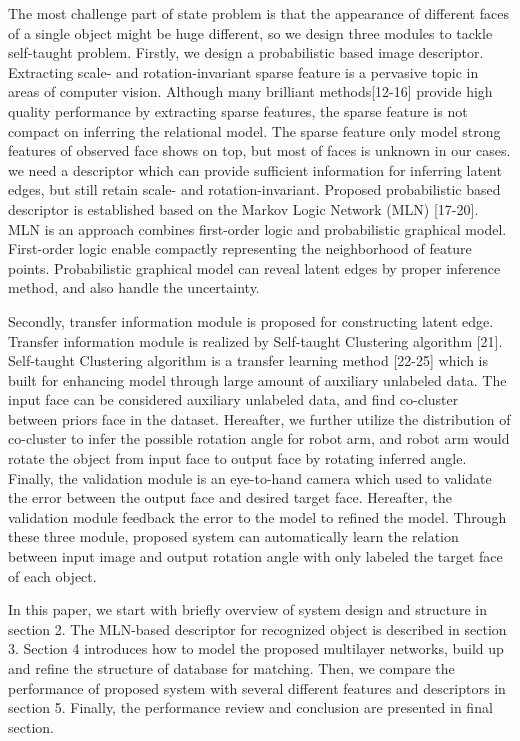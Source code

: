 \documentclass[journal]{IEEEtran}
\begin{document}
The most challenge part of state problem is that the appearance of different faces of a single object might be huge different, so we design three modules to tackle self-taught problem. Firstly, we design a probabilistic based image descriptor. Extracting scale- and rotation-invariant sparse feature is a pervasive topic in areas of computer vision. Although many brilliant methods[12-16] provide high quality performance by extracting sparse features, the sparse feature is not compact on inferring the relational model. The sparse feature only model strong features of observed face shows on top, but most of faces is unknown in our cases. we need a descriptor which can provide sufficient information for inferring latent edges, but still retain scale- and rotation-invariant. Proposed probabilistic based descriptor is established based on the Markov Logic Network (MLN) [17-20]. MLN is an approach combines first-order logic and probabilistic graphical model. First-order logic enable compactly representing the neighborhood of feature points. Probabilistic graphical model can reveal latent edges by proper inference method, and also handle the uncertainty. 

Secondly, transfer information module is proposed for constructing latent edge. Transfer information module is realized by Self-taught Clustering algorithm [21]. Self-taught Clustering algorithm is a transfer learning method [22-25] which is built for enhancing model through large amount of auxiliary unlabeled data. The input face can be considered auxiliary unlabeled data, and find co-cluster between priors face in the dataset. Hereafter, we further utilize the distribution of co-cluster to infer the possible rotation angle for robot arm, and robot arm would rotate the object from input face to output face by rotating inferred angle. Finally, the validation module is an eye-to-hand camera which used to validate the error between the output face and desired target face. Hereafter, the validation module feedback the error to the model to refined the model. Through these three module, proposed system can automatically learn the relation between input image and output rotation angle with only labeled the target face of each object.

In this paper, we start with briefly overview of system design and structure in section 2. The MLN-based descriptor for recognized object is described in section 3. Section 4 introduces how to model the proposed multilayer networks, build up and refine the structure of database for matching. Then, we compare the performance of proposed system with several different features and descriptors in section 5. Finally, the performance review and conclusion are presented in final section.
\end{document}
